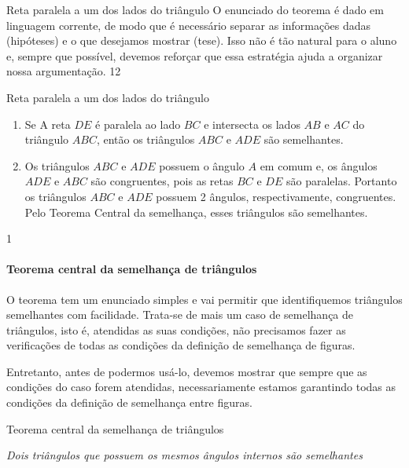 \begin{sugestions}{Reta paralela a um dos lados do triângulo}
{
O enunciado do teorema é dado em linguagem corrente, de modo que é necessário separar as informações dadas (hipóteses) e o que desejamos mostrar (tese). Isso não é tão natural para o aluno e, sempre que possível, devemos reforçar que essa estratégia ajuda a organizar nossa argumentação.
}{1}{2}
\end{sugestions}
\begin{answer}{Reta paralela a um dos lados do triângulo}
{
\begin{enumerate}
\item {} 
Se A reta \(DE\) é paralela ao lado \(BC\) e intersecta os lados \(AB\) e \(AC\) do triângulo \(ABC\), então os triângulos \(ABC\) e \(ADE\) são semelhantes.

\item {} 
Os triângulos \(ABC\) e \(ADE\) possuem o ângulo \(A\) em comum e, os ângulos \(ADE\) e \(ABC\) são congruentes, pois as retas \(BC\) e \(DE\) são paralelas. Portanto os triângulos \(ABC\) e \(ADE\) possuem 2 ângulos, respectivamente, congruentes. Pelo Teorema Central da semelhança, esses triângulos são semelhantes.

\end{enumerate}
}{1}
\end{answer}

\paragraph{Teorema central da semelhança de triângulos}



O teorema tem um enunciado simples e vai permitir que identifiquemos triângulos semelhantes com facilidade. Trata-se de mais um caso de semelhança de triângulos, isto é, atendidas as suas condições, não precisamos fazer as verificações de todas as condições da definição de semelhança de figuras.

Entretanto, antes de podermos usá-lo, devemos mostrar que sempre que as condições do caso forem atendidas, necessariamente estamos garantindo todas as condições da definição de semelhança entre figuras.

\begin{observationtitle}{Teorema central da semelhança de triângulos}

\textit{Dois triângulos que possuem os mesmos ângulos internos são semelhantes}
\end{observationtitle}


